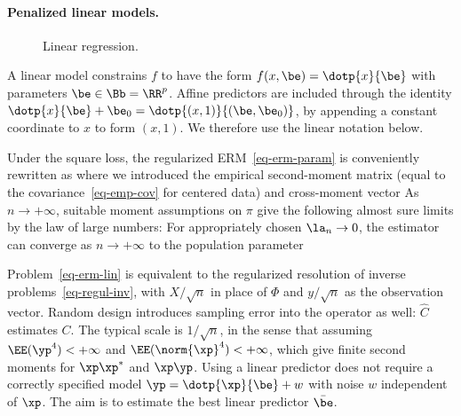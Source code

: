 \paragraph{Penalized linear models.}

\begin{figure}[tbp]
\centering
{}
\caption{Linear regression.}
\label{fig-review-ml-linear-fit}
\end{figure}
A linear model constrains $f$ to have the form $f(x,\be)=\dotp{x}{\be}$ with parameters $\be \in \Bb=\RR^p$. Affine predictors are included through the identity $\dotp{x}{\be}+\be_0=\dotp{(x,1)}{(\be,\be_0)}$, by appending a constant coordinate to $x$ to form $(x,1)$. We therefore use the linear notation below.

Under the square loss, the regularized ERM~\eqref{eq-erm-param} is conveniently rewritten as 
where we introduced the empirical second-moment matrix (equal to the covariance~\eqref{eq-emp-cov} for centered data) and cross-moment vector
As $n\to+\infty$, suitable moment assumptions on $\pi$ give the following almost sure limits by the law of large numbers:
For appropriately chosen $\la_n \rightarrow 0$, the estimator can converge as $n \rightarrow +\infty$ to the population parameter

Problem~\eqref{eq-erm-lin} is equivalent to the regularized resolution of inverse problems~\eqref{eq-regul-inv}, with $X/\sqrt n$ in place of $\Phi$ and $y/\sqrt n$ as the observation vector.
%
Random design introduces sampling error into the operator as well: $\hat C$ estimates $C$. The typical scale is $1/\sqrt{n}$, in the sense that
assuming $\EE(\yp^4)<+\infty$ and $\EE(\norm{\xp}^4)<+\infty$, which give finite second moments for $\xp\xp^*$ and $\xp\yp$. Using a linear predictor does not require a correctly specified model $\yp=\dotp{\xp}{\be} + w$ with noise $w$ independent of $\xp$. The aim is to estimate the best linear predictor $\bar\be$.

